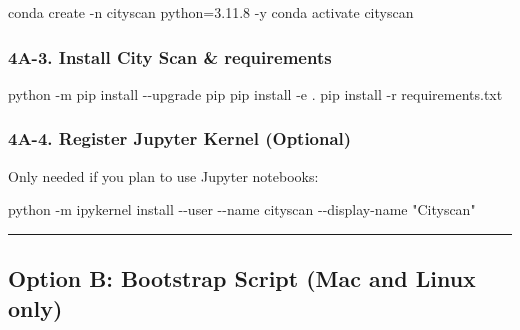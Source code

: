\documentclass[
  letterpaper,
  DIV=11,
  numbers=noendperiod]{scrreprt}
\newenvironment{Shaded}{\begin{snugshade}}{\end{snugshade}}
\newcommand{\AttributeTok}[1]{\textcolor[rgb]{0.40,0.45,0.13}{#1}}
\newcommand{\ExtensionTok}[1]{\textcolor[rgb]{0.00,0.23,0.31}{#1}}
\newcommand{\NormalTok}[1]{\textcolor[rgb]{0.00,0.23,0.31}{#1}}
\newcommand{\StringTok}[1]{\textcolor[rgb]{0.13,0.47,0.30}{#1}}
\begin{document}
\begin{Shaded}
\begin{Highlighting}[]
\ExtensionTok{conda}\NormalTok{ create }\AttributeTok{{-}n}\NormalTok{ cityscan python=3.11.8 }\AttributeTok{{-}y}
\ExtensionTok{conda}\NormalTok{ activate cityscan}
\end{Highlighting}
\end{Shaded}

\subsubsection{4A-3. Install City Scan \&
requirements}\label{a-3.-install-city-scan-requirements}

\begin{Shaded}
\begin{Highlighting}[]
\ExtensionTok{python} \AttributeTok{{-}m}\NormalTok{ pip install }\AttributeTok{{-}{-}upgrade}\NormalTok{ pip}
\ExtensionTok{pip}\NormalTok{ install }\AttributeTok{{-}e}\NormalTok{ .}
\ExtensionTok{pip}\NormalTok{ install }\AttributeTok{{-}r}\NormalTok{ requirements.txt}
\end{Highlighting}
\end{Shaded}

\subsubsection{4A-4. Register Jupyter Kernel
(Optional)}\label{a-4.-register-jupyter-kernel-optional}

Only needed if you plan to use Jupyter notebooks:

\begin{Shaded}
\begin{Highlighting}[]
\ExtensionTok{python} \AttributeTok{{-}m}\NormalTok{ ipykernel install }\AttributeTok{{-}{-}user} \AttributeTok{{-}{-}name}\NormalTok{ cityscan }\AttributeTok{{-}{-}display{-}name} \StringTok{"Cityscan"}
\end{Highlighting}
\end{Shaded}

\begin{center}\rule{0.5\linewidth}{0.5pt}\end{center}

\subsection{Option B: Bootstrap Script (Mac and Linux
only)}\label{option-b-bootstrap-script-mac-and-linux-only}
\end{document}
